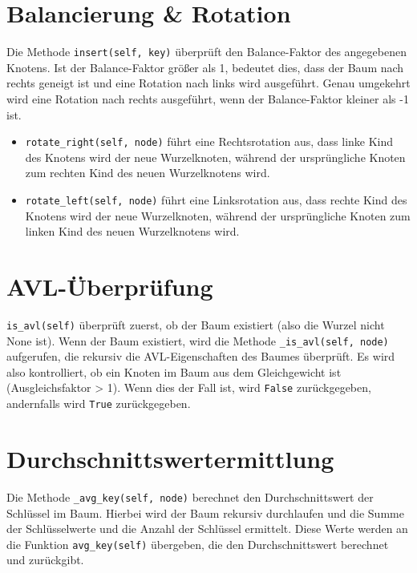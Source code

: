 \documentclass{article}
\begin{document}
\section*{Balancierung & Rotation}
Die Methode \texttt{insert(self, key)} überprüft den Balance-Faktor des angegebenen Knotens. Ist der Balance-Faktor größer als 1, bedeutet dies, dass der Baum nach rechts geneigt ist und
eine Rotation nach links wird ausgeführt. Genau umgekehrt wird eine Rotation nach rechts ausgeführt, wenn der Balance-Faktor kleiner als -1 ist.
\begin{itemize}
    \item \texttt{rotate_right(self, node)} führt eine Rechtsrotation aus, dass linke Kind des Knotens wird der neue Wurzelknoten, während der ursprüngliche Knoten zum rechten Kind des neuen Wurzelknotens wird.
    \item \texttt{rotate_left(self, node)} führt eine Linksrotation aus, dass rechte Kind des Knotens wird der neue Wurzelknoten, während der ursprüngliche Knoten zum linken Kind des neuen Wurzelknotens wird.
\end{itemize}

\section*{AVL-Überprüfung}
\texttt{is_avl(self)} überprüft zuerst, ob der Baum existiert (also die Wurzel nicht None ist). Wenn der Baum existiert, wird die Methode \texttt{_is_avl(self, node)} aufgerufen, die rekursiv die AVL-Eigenschaften des Baumes überprüft.
Es wird also kontrolliert, ob ein Knoten im Baum aus dem Gleichgewicht ist (Ausgleichsfaktor > 1). Wenn dies der Fall ist, wird \texttt{False} zurückgegeben, andernfalls wird \texttt{True} zurückgegeben.

\section*{Durchschnittswertermittlung}
Die Methode \texttt{_avg_key(self, node)} berechnet den Durchschnittswert der Schlüssel im Baum. Hierbei wird der Baum rekursiv durchlaufen und die Summe der Schlüsselwerte und die Anzahl der Schlüssel ermittelt.
Diese Werte werden an die Funktion \texttt{avg_key(self)} übergeben, die den Durchschnittswert berechnet und zurückgibt.
\end{document}
